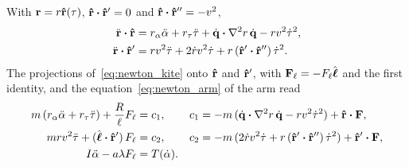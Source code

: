 With \(\vb r = r\vu r(\tau)\), \(\vu r\vdot\vu r' = 0\) and \(\vu r\vdot\vu r'' = -v^2\),
\begin{align}
    \ddot{\vb r}\vdot\vu r &= r_\alpha\ddot\alpha + r_\tau\ddot\tau + \dq\vdot\nabla^2 r\,\dq - r v^2\dot\tau^2, \\
    \ddot{\vb r}\vdot\vu r' &= r v^2\ddot\tau + 2\dot r v^2\dot\tau + r\,(\vu r'\vdot\vu r'')\,\dot\tau^2.
\end{align}
The projections of~\eqref{eq:newton_kite} onto \(\vu r\) and \(\vu r'\), with \(\vb F_\ell = -F_\ell\hat{\boldsymbol{\ell}}\) and the first identity, and the equation~\eqref{eq:newton_arm} of the arm read
\begin{align}
    m\,(r_\alpha\ddot\alpha + r_\tau\ddot\tau) + \frac{R}{\ell}F_\ell &= c_1, &
    c_1 &= -m\,(\dq\vdot\nabla^2 r\,\dq - r v^2\dot\tau^2) + \vu r\vdot\vb F, \label{eq:K1} \\
    m r v^2\ddot\tau + (\hat{\boldsymbol{\ell}}\vdot\vu r')\,F_\ell &= c_2, &
    c_2 &= -m\,(2\dot r v^2\dot\tau + r\,(\vu r'\vdot\vu r'')\,\dot\tau^2) + \vu r'\vdot\vb F, \label{eq:K2} \\
    I\ddot\alpha - a\lambda F_\ell &= T(\dot\alpha). \label{eq:A}
\end{align}

